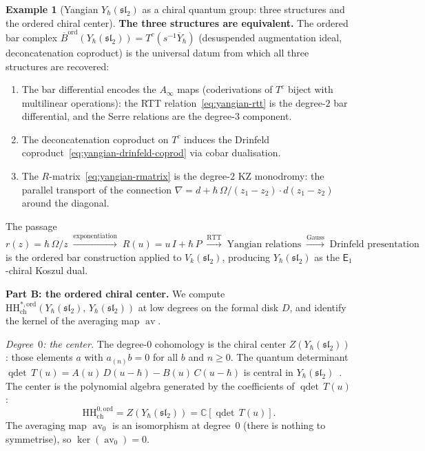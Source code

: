 \documentclass[11pt,reqno]{amsart}
\theoremstyle{definition}
\newtheorem{example}[theorem]{Example}
\theoremstyle{remark}
\newcommand{\HH}{\mathrm{HH}}
\newcommand{\Ainf}{A_{\infty}}
\newcommand{\Eone}{\mathsf{E}_{1}}
\DeclareMathOperator{\av}{av}
\newcommand{\Barord}{\overline{B}^{\mathrm{ord}}}
\newcommand{\CC}{\mathbb{C}}
\numberwithin{equation}{section}
\begin{document}
\begin{example}[Yangian $Y_\hbar(\mathfrak{sl}_2)$
as a chiral quantum group: three structures and the
ordered chiral center]
\medskip
\noindent
\textbf{The three structures are equivalent.}
The ordered bar complex $\Barord(Y_\hbar(\mathfrak{sl}_2))
= T^c(s^{-1}\overline{Y}_\hbar)$ (desuspended augmentation
ideal, deconcatenation coproduct) is the universal datum
from which all three structures are recovered:
\begin{enumerate}[label=\textup{(\alph*)}]
\item The bar differential encodes the $\Ainf$ maps
  (coderivations of $T^c$ biject with multilinear
  operations): the RTT relation~\eqref{eq:yangian-rtt} is
  the degree-$2$ bar differential, and the Serre relations
  are the degree-$3$ component.
\item The deconcatenation coproduct on $T^c$ induces the
  Drinfeld coproduct~\eqref{eq:yangian-drinfeld-coprod}
  via cobar dualisation.
\item The $R$-matrix~\eqref{eq:yangian-rmatrix} is the
  degree-$2$ KZ monodromy: the parallel transport of the
  connection $\nabla = d + \hbar\,\Omega/(z_1 - z_2)
  \cdot d(z_1 - z_2)$ around the diagonal.
\end{enumerate}
The passage
$r(z) = \hbar\,\Omega/z
\;\xrightarrow{\text{exponentiation}}\;
R(u) = u\,I + \hbar\,P
\;\xrightarrow{\text{RTT}}\;
\text{Yangian relations}
\;\xrightarrow{\text{Gauss}}\;
\text{Drinfeld presentation}$
is the ordered bar construction applied to
$V_k(\mathfrak{sl}_2)$, producing
$Y_\hbar(\mathfrak{sl}_2)$ as the $\Eone$-chiral Koszul
dual.

\medskip
\noindent
\textbf{Part B: the ordered chiral center.}
We compute $\HH^{*,\mathrm{ord}}_{\mathrm{ch}}
(Y_\hbar(\mathfrak{sl}_2),\,Y_\hbar(\mathfrak{sl}_2))$
at low degrees on the formal disk $D$, and identify
the kernel of the averaging map $\av$.

\smallskip
\noindent\emph{Degree~$0$: the center.}
The degree-$0$ cohomology is the chiral center
$Z(Y_\hbar(\mathfrak{sl}_2))$: those elements $a$ with
$a_{(n)}b = 0$ for all $b$ and $n \geq 0$.
The quantum determinant
$\operatorname{qdet}\,T(u) = A(u)\,D(u - \hbar)
- B(u)\,C(u - \hbar)$
is central in $Y_\hbar(\mathfrak{sl}_2)$~\cite{Molev07}.
The center is the polynomial algebra generated by the
coefficients of $\operatorname{qdet}\,T(u)$:
\begin{equation}\label{eq:yangian-hh0}
  \HH^{0,\mathrm{ord}}_{\mathrm{ch}}
  = Z(Y_\hbar(\mathfrak{sl}_2))
  = \CC[\operatorname{qdet}\,T(u)].
\end{equation}
The averaging map $\av_0$ is an isomorphism at degree~$0$
(there is nothing to symmetrise), so
$\ker(\av_0) = 0$.


\end{example}
\end{document}
